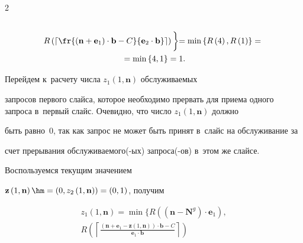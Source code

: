 \begin{multicols}{2}
\begin{multline*}
\\


R \left(\left\lceil \fr{\left(\mathbf{n}+\mathbf{e}_1 \right)\cdot\mathbf{b} - 


C}{\mathbf{e}_2\cdot\mathbf{b}} \right\rceil\right)


\biggl\} =


\min \left\{ R \left(4\right),R \left(1\right) \right\} = {}\\


{}= \min \left\{4,1\right\} = 1.


\end{multline*}





Перейдем к~расчету числа $z_1\left(1,\mathbf{n}\right)$ об\-слу\-жи\-ва\-емых 


запросов первого слайса, которое необходимо прервать для приема одного запроса в~первый слайс. Очевидно, что число $z_1\left(1,\mathbf{n}\right)$ должно 


быть равно~$0$, так как запрос не может быть принят в~слайс на обслуживание за 


счет прерывания об\-слу\-жи\-ва\-емо\-\mbox{го(-ых)} за\-про\-са(-ов) в~этом же слайсе. 


Воспользуемся текущим значением 


$\mathbf{z}\left(1,\mathbf{n}\right)\hm=\left(0,z_2\left(1,\mathbf{n}\right)\right)


=\left(0,1\right)$, получим





\vspace*{-6pt}





\noindent


\begin{multline*}


z_1\left(1,\mathbf{n}\right) =


\min


\biggl\{


R \left(\left(\mathbf{n}-\mathbf{N}^{{g}}\right) \cdot \mathbf{e}_1\right), 


\\


R \left(\left\lceil \frac{\left(\mathbf{n}+\mathbf{e}_1 - 


\mathbf{z}\left(1,\mathbf{n}\right) \right)\cdot\mathbf{b} - 


C}{\mathbf{e}_1\cdot\mathbf{b}} \right\rceil\right)



\end{multline*}
\end{multicols}
